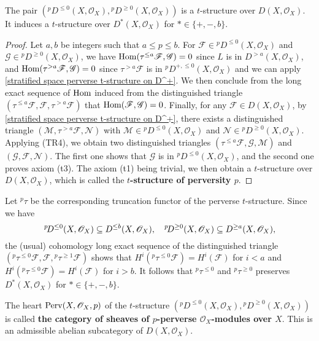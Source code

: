\begin{corollary}\label{stratified space perverse t-structure on D(X)}
The pair $({^p\!D^{\leq 0}}(X,\mathscr{O}_X),{^p\!D^{\geq 0}}(X,\mathscr{O}_X))$ is a $t$-structure over $D(X,\mathscr{O}_X)$. It induces a $t$-structure over $D^*(X,\mathscr{O}_X)$ for $*\in\{+,-,b\}$.
\end{corollary}
\begin{proof}
Let $a,b$ be integers such that $a\leq p\leq b$. For $\mathscr{F}\in {^p\!D^{\leq 0}}(X,\mathscr{O}_X)$ and $\mathscr{G}\in{^p\!D^{\geq 0}}(X,\mathscr{O}_X)$, we have $\mathrm{Hom}(\tau^{\leq a}\mathscr{F},\mathscr{G})=0$ since $L$ is in $D^{>a}(X,\mathscr{O}_X)$, and $\mathrm{Hom}(\tau^{>a}\mathscr{F},\mathscr{G})=0$ since $\tau^{>a}\mathscr{F}$ is in ${^p\!D^{+,\leq 0}}(X,\mathscr{O}_X)$ and we can apply \cref{stratified space perverse t-structure on D^+}. We then conclude from the long exact sequence of $\mathrm{Hom}$ induced from the distinguished triangle $(\tau^{\leq a}\mathscr{F},\mathscr{F},\tau^{>a}\mathscr{F})$ that $\mathrm{Hom}(\mathscr{F},\mathscr{G})=0$. Finally, for any $\mathscr{F}\in D(X,\mathscr{O}_X)$, by \cref{stratified space perverse t-structure on D^+}, there exists a distinguished triangle $(\mathscr{M},\tau^{>a}\mathscr{F},\mathscr{N})$ with $\mathscr{M}\in {^p\!D^{\leq 0}}(X,\mathscr{O}_X)$ and $\mathscr{N}\in {^p\!D^{\geq 0}}(X,\mathscr{O}_X)$. Applying (TR4), we obtain two distinguished triangles $(\tau^{\leq a}\mathscr{F},\mathscr{G},\mathscr{M})$ and $(\mathscr{G},\mathscr{F},\mathscr{N})$. The first one shows that $\mathscr{G}$ is in ${^p\!D^{\leq 0}}(X,\mathscr{O}_X)$, and the second one proves axiom (t3). The axiom (t1) being trivial, we then obtain a $t$-structure over $D(X,\mathscr{O}_X)$, which is called the \textbf{$t$-structure of perversity $p$}.
\end{proof}

Let ${^p\!}\tau$ be the corresponding truncation functor of the perverse $t$-structure. Since we have
\[{^p\!D^{\leq 0}}(X,\mathscr{O}_X)\subseteq D^{\leq b}(X,\mathscr{O}_X),\quad {^p\!D^{\geq 0}}(X,\mathscr{O}_X)\subseteq D^{\geq a}(X,\mathscr{O}_X),\]
the (usual) cohomology long exact sequence of the distinguished triangle $({^p\!\tau^{\leq 0}}\mathscr{F},\mathscr{F},{^p\!\tau^{\geq 1}}\mathscr{F})$ shows that $H^i({^p\!\tau^{\leq 0}}\mathscr{F})=H^i(\mathscr{F})$ for $i<a$ and $H^i({^p\!\tau^{\leq 0}}\mathscr{F})=H^i(\mathscr{F})$ for $i>b$. It follows that ${^p\!\tau^{\leq 0}}$ and ${^p\!\tau^{\geq 0}}$ preserves $D^*(X,\mathscr{O}_X)$ for $*\in\{+,-,b\}$.

\begin{definition}
The heart $\mathrm{Perv}(X,\mathscr{O}_X,p)$ of the $t$-structure $({^p\!D^{\leq 0}}(X,\mathscr{O}_X),{^p\!D^{\geq 0}}(X,\mathscr{O}_X))$ is called \textbf{the category of sheaves of $p$-perverse $\mathscr{O}_X$-modules over $X$}. This is an admissible abelian subcategory of $D(X,\mathscr{O}_X)$.
\end{definition}

